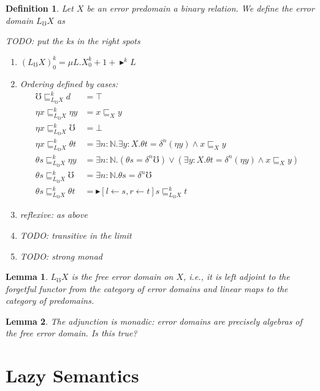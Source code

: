 \documentclass{article}
\newtheorem{definition}{Definition}[section]
\newtheorem{lemma}{Lemma}[section]
\newcommand{\later}{{\blacktriangleright}}
\newcommand{\err}{\mho}
\newcommand{\errlift}{L_\err}
\newcommand{\ltdynp}[1]{\mathrel{\sqsubseteq_{#1}}}
\newcommand{\kltp}[2]{\mathrel{\sqsubseteq^{#1}_{#2}}}
\begin{document}
\begin{definition}
  Let $X$ be an error predomain a binary relation. We define the error
  domain $\errlift X$ as

  TODO: put the ks in the right spots

  \begin{enumerate}
  \item $(\errlift X)_0^k = \mu L. X_0^k + 1 + \later^k L$
  \item Ordering defined by cases:
    \begin{align*}
      \err \kltp k {\errlift X} d &= \top\\
      \eta x \kltp k {\errlift X} \eta y &= x \ltdynp X y\\
      \eta x \kltp k {\errlift X} \err &= \bot\\
      \eta x \kltp k {\errlift X} \theta t &= \exists{n:\mathbb N}.\exists{y: X}. \theta t = \delta^n (\eta y) \wedge x \ltdynp X y\\
      \theta s \kltp k {\errlift X} \eta y &= \exists{n:\mathbb N}.(\theta s = \delta^n \err)\vee(\exists{y: X}. \theta t = \delta^n (\eta y) \wedge x \ltdynp X y)\\
      \theta s \kltp k {\errlift X} \err &= \exists{n:\mathbb N}.\theta s = \delta^n \err\\
      \theta s \kltp k {\errlift X} \theta t &= \later[l \leftarrow s,r\leftarrow t] s \kltp k {\errlift X} t
    \end{align*}
  \item reflexive: as above
  \item TODO: transitive in the limit
  \item TODO: strong monad
  \end{enumerate}
\end{definition}

\begin{lemma}
  $\errlift X$ is the free error domain on $X$, i.e., it is left
  adjoint to the forgetful functor from the category of error domains
  and linear maps to the category of predomains.
\end{lemma}

\begin{lemma}
  The adjunction is monadic: error domains are precisely algebras of
  the free error domain. Is this true?
\end{lemma}

\section{Lazy Semantics}
\end{document}
